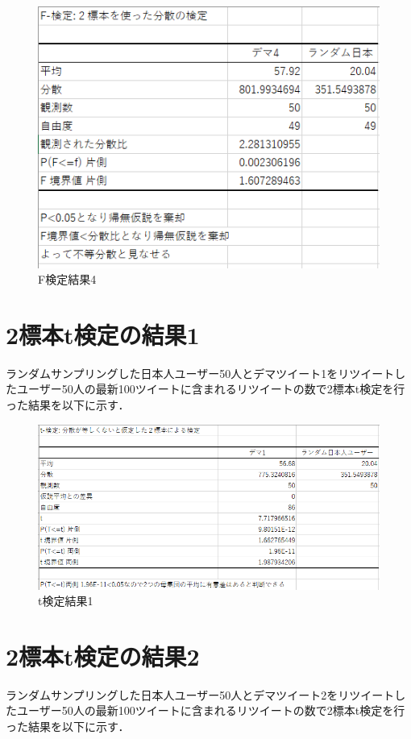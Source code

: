 \begin{figure}[htb]
\centering
\includegraphics[width=13cm]{17.png}
\caption{F検定結果4}\label{29}
\end{figure}
\clearpage

\section{2標本t検定の結果1}
ランダムサンプリングした日本人ユーザー50人とデマツイート1をリツイートしたユーザー50人の最新100ツイートに含まれるリツイートの数で2標本t検定を行った結果を以下に示す．

\begin{figure}[htb]
\centering
\includegraphics[width=13cm]{18.png}
\caption{t検定結果1}\label{30}
\end{figure}
\clearpage

\section{2標本t検定の結果2}
ランダムサンプリングした日本人ユーザー50人とデマツイート2をリツイートしたユーザー50人の最新100ツイートに含まれるリツイートの数で2標本t検定を行った結果を以下に示す．

